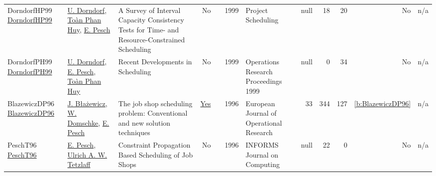 {\begin{longtable}{>{\raggedright\arraybackslash}p{3cm}>{\raggedright\arraybackslash}p{6cm}>{\raggedright\arraybackslash}p{6.5cm}rrrp{2.5cm}rrrrr}
DorndorfHP99 \href{http://dx.doi.org/10.1007/978-1-4615-5533-9_10}{DorndorfHP99} & \hyperref[auth:a911]{U. Dorndorf}, \hyperref[auth:a912]{Toàn Phan Huy}, \hyperref[auth:a441]{E. Pesch} & A Survey of Interval Capacity Consistency Tests for Time- and Resource-Constrained Scheduling & No & \cite{DorndorfHP99} & 1999 & Project Scheduling & null & 18 & 20 & No & n/a\\
DorndorfPH99 \href{http://dx.doi.org/10.1007/978-3-642-58409-1_35}{DorndorfPH99} & \hyperref[auth:a911]{U. Dorndorf}, \hyperref[auth:a441]{E. Pesch}, \hyperref[auth:a912]{Toàn Phan Huy} & Recent Developments in Scheduling & No & \cite{DorndorfPH99} & 1999 & Operations Research Proceedings 1999 & null & 0 & 34 & No & n/a\\
BlazewiczDP96 \href{http://dx.doi.org/10.1016/0377-2217(95)00362-2}{BlazewiczDP96} & \hyperref[auth:a986]{J. Błażewicz}, \hyperref[auth:a987]{W. Domschke}, \hyperref[auth:a441]{E. Pesch} & The job shop scheduling problem: Conventional and new solution techniques & \href{../works/BlazewiczDP96.pdf}{Yes} & \cite{BlazewiczDP96} & 1996 & European Journal of Operational Research & 33 & 344 & 127 & \ref{b:BlazewiczDP96} & n/a\\
PeschT96 \href{http://dx.doi.org/10.1287/ijoc.8.2.144}{PeschT96} & \hyperref[auth:a441]{E. Pesch}, \hyperref[auth:a1236]{Ulrich A. W. Tetzlaff} & Constraint Propagation Based Scheduling of Job Shops & No & \cite{PeschT96} & 1996 & INFORMS Journal on Computing & null & 22 & 0 & No & n/a\\
\end{longtable}
}

\clearpage

